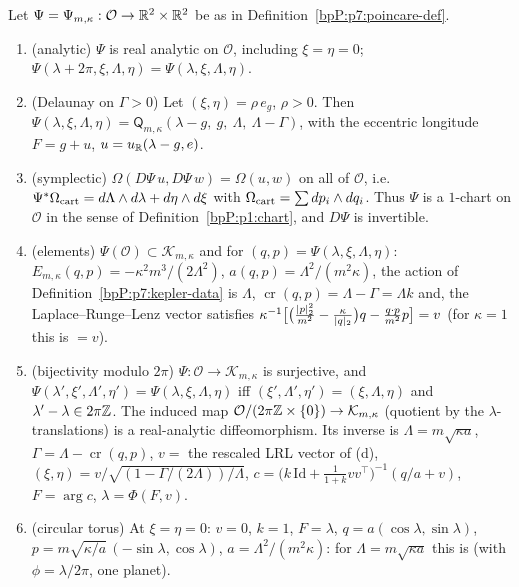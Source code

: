 \begin{theorem}[Poincar\'e chart, analytic through $e=0$]\label{bpP:p7:poincare}
Let $\Psi=\Psi_{m,\kappa}:\mathcal O\to\mathbb{R}^2\times\mathbb{R}^2$ be as in Definition~\ref{bpP:p7:poincare-def}.
\begin{enumerate}[label=(\alph*)]
\item \textup{(analytic)} $\Psi$ is real analytic on $\mathcal O$, including $\xi=\eta=0$; $\Psi(\lambda+2\pi,\xi,\Lambda,\eta)=\Psi(\lambda,\xi,\Lambda,\eta)$.
\item \textup{(Delaunay on $\Gamma>0$)} Let $(\xi,\eta)=\rho\,e_g$, $\rho>0$. Then $\Psi(\lambda,\xi,\Lambda,\eta)=\mathsf Q_{m,\kappa}(\lambda-g,\ g,\ \Lambda,\ \Lambda-\Gamma)$, with the eccentric longitude $F=g+u$, $u=u_{\mathbb{R}}(\lambda-g,e)$.
\item \textup{(symplectic)} $\Omega(D\Psi\,u,D\Psi\,w)=\Omega(u,w)$ on all of $\mathcal O$, i.e.\ $\Psi^*\Omega_{\rm cart}=d\Lambda\wedge d\lambda+d\eta\wedge d\xi$ with $\Omega_{\rm cart}=\sum dp_i\wedge dq_i$. Thus $\Psi$ is a $1$-chart on $\mathcal O$ in the sense of Definition~\ref{bpP:p1:chart}, and $D\Psi$ is invertible.
\item \textup{(elements)} $\Psi(\mathcal O)\subset\mathcal K_{m,\kappa}$ and for $(q,p)=\Psi(\lambda,\xi,\Lambda,\eta)$: $E_{m,\kappa}(q,p)=-\kappa^2m^3/(2\Lambda^2)$, $a(q,p)=\Lambda^2/(m^2\kappa)$, the action of Definition~\ref{bpP:p7:kepler-data} is $\Lambda$, $\operatorname{cr}(q,p)=\Lambda-\Gamma=\Lambda k$ and, the Laplace--Runge--Lenz vector satisfies $\kappa^{-1}\bigl[\bigl(\frac{\lvert p\rvert_2^2}{m^2}-\frac\kappa{\lvert q\rvert_2}\bigr)q-\frac{q\cdot p}{m^2}p\bigr]=v$ (for $\kappa=1$ this is ${}=v$).
\item \textup{(bijectivity modulo $2\pi$)} $\Psi:\mathcal O\to\mathcal K_{m,\kappa}$ is surjective, and $\Psi(\lambda',\xi',\Lambda',\eta')=\Psi(\lambda,\xi,\Lambda,\eta)$ iff $(\xi',\Lambda',\eta')=(\xi,\Lambda,\eta)$ and $\lambda'-\lambda\in2\pi\mathbb{Z}$. The induced map $\mathcal O/(2\pi\mathbb{Z}\times\{0\})\to\mathcal K_{m,\kappa}$ (quotient by the $\lambda$-translations) is a real-analytic diffeomorphism. Its inverse is $\Lambda=m\sqrt{\kappa a}$, $\Gamma=\Lambda-\operatorname{cr}(q,p)$, $v=$ the rescaled LRL vector of (d), $(\xi,\eta)=v/\sqrt{(1-\Gamma/(2\Lambda))/\Lambda}$, $c=\bigl(k\,\mathrm{Id}+\tfrac1{1+k}vv^{\top}\bigr)^{-1}(q/a+v)$, $F=\arg c$, $\lambda=\Phi(F,v)$.
\item \textup{(circular torus)} At $\xi=\eta=0$: $v=0$, $k=1$, $F=\lambda$, $q=a(\cos\lambda,\sin\lambda)$, $p=m\sqrt{\kappa/a}\,(-\sin\lambda,\cos\lambda)$, $a=\Lambda^2/(m^2\kappa)$: for $\Lambda=m\sqrt{\kappa a}$ this is  (with $\phi=\lambda/2\pi$, one planet).
\end{enumerate}
\end{theorem}
